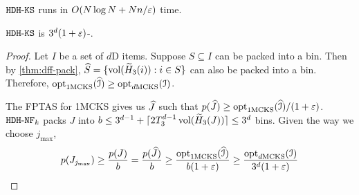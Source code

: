 $\hdhks$ runs in $O(N\log N + Nn/\eps)$ time.

\begin{theorem}
\label{thm:emb-ks}
$\hdhks$ is $3^d(1+\eps)$-\appx{}.
\end{theorem}
\begin{proof}
Let $I$ be a set of $d$D items.
Suppose $S \subseteq I$ can be packed into a bin.
Then by \cref{thm:dff-pack}, $\widehat{S} = \{\vol(\wHk[3](i)): i \in S\}$
can also be packed into a bin. Therefore, $\optdmcks[1](\Icalhat) \ge \optdmcks(\Ical)$.

The FPTAS for 1MCKS gives us $\Jhat$ such that
$p(\Jhat) \ge \optdmcks[1](\Icalhat)/(1+\eps)$.
$\hdhknf$ packs $J$ into
$b \le 3^{d-1} + \smallceil{2T_3^{d-1}\vol(\wHk[3](J))} \le 3^d$ bins.
Given the way we choose $j_{\max}$,
\[ p(J_{j_{\max}}) \ge \frac{p(J)}{b} = \frac{p(\Jhat)}{b}
\ge \frac{\optdmcks[1](\Icalhat)}{b(1+\eps)} \ge \frac{\optdmcks(\Ical)}{3^d(1+\eps)}  \qedhere \]
\end{proof}
